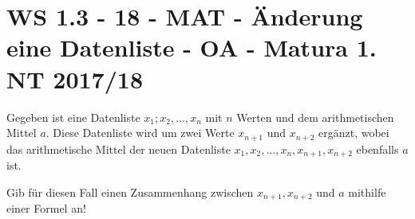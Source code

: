 \section{WS 1.3 - 18 - MAT - Änderung eine Datenliste - OA - Matura 1. NT 2017/18}

\begin{beispiel}[WS 1.3]{1}
Gegeben ist eine Datenliste $x_1; x_2, ..., x_n$ mit $n$ Werten und dem arithmetischen Mittel $a$. Diese Datenliste wird um zwei Werte $x_{n+1}$ und $x_{n+2}$ ergänzt, wobei das arithmetische Mittel der neuen Datenliste $x_1, x_2, ..., x_n, x_{n+1}, x_{n+2}$ ebenfalls $a$ ist.

Gib für diesen Fall einen Zusammenhang zwischen $x_{n+1}, x_{n+2}$ und $a$ mithilfe einer Formel an!

\end{beispiel}